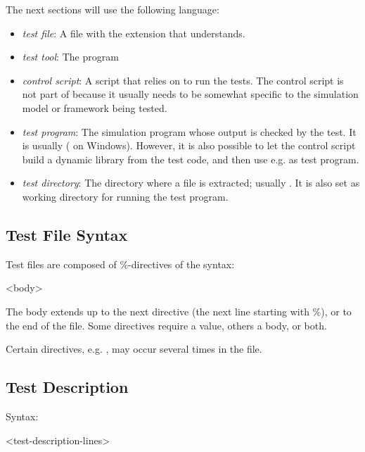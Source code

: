 The next sections will use the following language:

\begin{itemize}
\item \textit{test file}: A file with the  extension that  understands.
\item \textit{test tool}: The  program
\item \textit{control script}: A script that relies on  to run the tests.
  The control script is not part of {\opp} because it usually needs to be somewhat
  specific to the simulation model or framework being tested.
\item \textit{test program}: The simulation program whose output is checked by the test.
  It is usually  ( on Windows). However, it is
  also possible to let the control script build a dynamic library from the test code, and
  then use e.g.  as test program.
\item \textit{test directory}: The directory where a  file
  is extracted; usually . It is also set as working
  directory for running the test program.
\end{itemize}


\subsection{Test File Syntax}
\label{sec:testing:opptest:test-file-syntax}

Test files are composed of \%-directives of the syntax:

\begin{filelisting}
<body>
\end{filelisting}

The body extends up to the next directive (the next line starting with \%),
or to the end of the file. Some directives require a value, others a body, or both.

Certain directives, e.g. , may occur several times in the file.

\subsection{Test Description}
\label{sec:testing:opptest:test-description}

Syntax:
\begin{filelisting}
<test-description-lines>
\end{filelisting}

